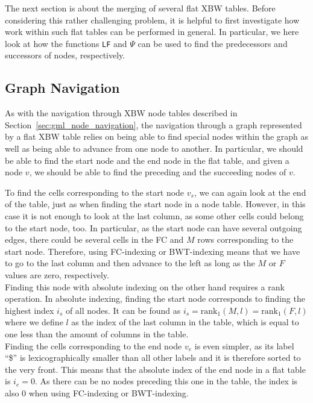 \documentclass[a4paper,12pt,twoside,BCOR=10mm]{scrbook}
\begin{document}
The next section is about the merging of several flat XBW tables.
Before considering this rather challenging problem,
it is helpful to first investigate how work within such flat tables can be performed in general.
In particular, we here look at how
the functions \texttt{LF} and $ \Psi $ can be used to find the predecessors and successors
of nodes, respectively.

\subsection{Graph Navigation}

As with the navigation through XBW node tables described in Section~\ref{sec:gml_node_navigation},
the navigation through a graph represented by a flat XBW table relies on
being able to find special nodes within the graph
as well as being able to advance from one node to another.
In particular, we should be able to find the start node and the end node in the flat table,
and given a node $ v $, we should be able to find the preceding and the succeeding nodes of $ v $.

To find the cells corresponding to the start node $ v_s $, we can again look at the end of the table,
just as when finding the start node in a node table.
However, in this case it is not enough to look at the last column, as some other cells could belong
to the start node, too. In particular, as the start node can have several outgoing edges,
there could be several cells in the FC and $ M $ rows corresponding to the start node.
Therefore, using FC-indexing or BWT-indexing means that we have to go to the last column and then 
advance to the left as long as the $ M $ or $ F $ values are zero, respectively. \\
Finding this node with absolute indexing on the other hand requires a rank operation. 
In absolute indexing, finding the start node 
corresponds to finding the highest index $ i_s $ of all nodes.
It can be found as $ i_s = \textrm{rank}_1 ( M, l ) = \textrm{rank}_1 ( F, l ) $ where we
define $ l $ as the index of the last column in the table,
which is equal to one less than the amount of columns in the table. \\
Finding the cells corresponding to the end node $ v_e $ is even simpler, as its label “\$” is
lexicographically smaller than all other labels and it is therefore sorted to the very front.
This means that the absolute index of the end node in a flat table is $ i_e = 0 $.
As there can be no nodes preceding this one in the table, the index is also 0 when using
FC-indexing or BWT-indexing.
\end{document}
